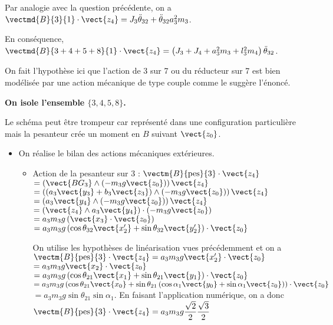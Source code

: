 \ifprof
\begin{corrige}
Par analogie avec la question précédente, on a $\vectmd{B}{3}{1}\cdot\vect{z_4}= J_3\ddot{\theta}_{32}+\ddot{\theta}_{32}a_3^2 m_3$.

En conséquence,  $\vectmd{B}{3+4+5+8}{1}\cdot\vect{z_4} = \left(J_3+J_4+a_3^2 m_3  +l_3^2 m_4\right) \ddot{\theta}_{32}$.

\begin{rem}
On fait l'hypothèse ici que l'action de 3 sur 7 ou du réducteur sur 7 est bien modélisée par une action mécanique de type couple comme le suggère l'énoncé.
\end{rem}



\textbf{On isole l'ensemble $\{3,4,5,8\}$.}

\begin{rem}
Le schéma peut être trompeur car représenté dans une configuration particulière mais la pesanteur crée un moment en $B$ suivant $\vect{z_0}$.
\end{rem}

\begin{itemize}
\item On réalise le bilan des actions mécaniques extérieures. 
\begin{itemize}
\item Action de la pesanteur sur 3 : 
$\vectm{B}{\text{pes}}{3}\cdot \vect{z_4} $ $ =\left(\vect{BG_3}\wedge \left(-m_3g \vect{z_0}\right) \right)\vect{z_4}$ 
$ =\left(\left( a_3\vect{y_3} + b_3\vect{z_3}  \right)\wedge \left(-m_3g \vect{z_0}\right)\right)\vect{z_4}$
$ =\left( a_3\vect{y_4} \wedge \left(-m_3g \vect{z_0}\right)\right)\vect{z_4}$
$ =\left( \vect{z_4} \wedge a_3\vect{y_4}\right)\cdot  \left(-m_3g \vect{z_0}\right)$
$ = a_3 m_3g \left( \vect{x_3}\cdot \vect{z_0} \right)$
$ = a_3 m_3g \left(  \cos\theta_{32} \vect{x_2'} +\sin\theta_{32} \vect{y_2'} \right)\cdot \vect{z_0} $

On utilise les hypothèses de linéarisation vues précédemment et on a 
$\vectm{B}{\text{pes}}{3}\cdot \vect{z_4}= a_3 m_3g \vect{x_2'} \cdot \vect{z_0} $ 
$= a_3 m_3g \vect{x_2} \cdot \vect{z_0} $
$= a_3 m_3g \left( \cos \theta_{21} \vect{x_1} +\sin \theta_{21} \vect{y_1} \right)\cdot \vect{z_0} $
$= a_3 m_3g \left( \cos \theta_{21} \vect{x_0} +\sin \theta_{21}  \left( \cos \alpha_1 \vect{y_0} + \sin \alpha_1 \vect{z_0} \right) \right)\cdot \vect{z_0} $
$= a_3 m_3g \sin \theta_{21}   \sin \alpha_1    $. En faisant l'application numérique, on a donc 
$\vectm{B}{\text{pes}}{3}\cdot \vect{z_4}= a_3 m_3g  \dfrac{\sqrt{2}}{2} \dfrac{\sqrt{3}}{2}$


\end{itemize}
\end{itemize}
\end{corrige}

